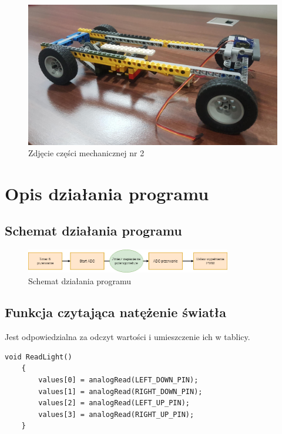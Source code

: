 \documentclass[10pt, a4paper]{article}
\begin{document}
		\begin{figure}[H]
		\centering
		\includegraphics[width=1\textwidth]{figures/20190410_135853.jpg}
		\caption{Zdjęcie części mechanicznej nr 2}
		\label{fig:Zdjęcie części mechanicznej nr 2}
	\end{figure}

\section{Opis działania programu}

\subsection{Schemat działania programu}
	\begin{figure}[H]
		\centering
		\includegraphics[width=0.8\textwidth]{figures/diagramPWM.png}
		\caption{Schemat działania programu}
		\label{fig:diagramPWM}
	\end{figure}

\subsection{Funkcja czytająca natężenie światła}
Jest odpowiedzialna za odczyt wartości i umieszczenie ich w tablicy.
	\begin{lstlisting}[tabsize=2]
	void ReadLight()
	{
		values[0] = analogRead(LEFT_DOWN_PIN);
		values[1] = analogRead(RIGHT_DOWN_PIN);
		values[2] = analogRead(LEFT_UP_PIN);
		values[3] = analogRead(RIGHT_UP_PIN);
	}
	\end{lstlisting}
\end{document}
